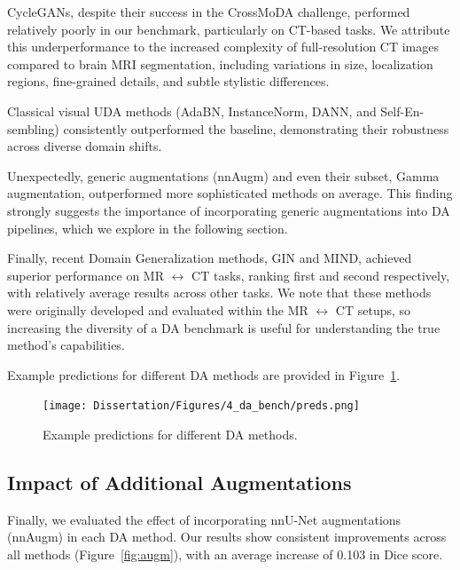 CycleGANs, despite their success in the CrossMoDA challenge, performed relatively poorly in our benchmark, particularly on CT-based tasks. We attribute this underperformance to the increased complexity of full-resolution CT images compared to brain MRI segmentation, including variations in size, localization regions, fine-grained details, and subtle stylistic differences.

Classical visual UDA methods (AdaBN, InstanceNorm, DANN, and Self-En- sembling) consistently outperformed the baseline, demonstrating their robustness across diverse domain shifts. 

Unexpectedly, generic augmentations (nnAugm) and even their subset, Gamma augmentation, outperformed more sophisticated methods on average. This finding strongly suggests the importance of incorporating generic augmentations into DA pipelines, which we explore in the following section.

Finally, recent Domain Generalization methods, GIN and MIND, achieved superior performance on MR $\leftrightarrow$ CT tasks, ranking first and second respectively, with relatively average results across other tasks. We note that these methods were originally developed and evaluated within the MR $\leftrightarrow$ CT setups, so increasing the diversity of a DA benchmark is useful for understanding the true method's capabilities.

Example predictions for different DA methods are provided in Figure~\ref{fig:predicts}.


\begin{figure}[ht!]
	\centering
	\texttt{[image: Dissertation/Figures/4\_da\_bench/preds.png]}
	\caption{Example predictions for different DA methods.}
	\label{fig:predicts}
\end{figure}


\subsection{Impact of Additional Augmentations}

Finally, we evaluated the effect of incorporating nnU-Net augmentations (nnAugm) in each DA method. Our results show consistent improvements across all methods (Figure~\ref{fig:augm}), with an average increase of 0.103 in Dice score.


